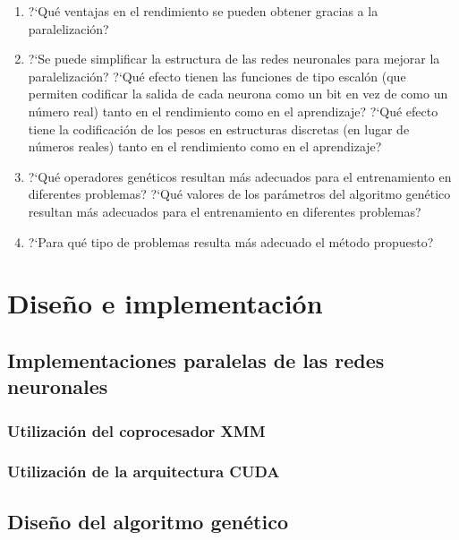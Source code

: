 \documentclass[a4paper,11pt]{article}
\begin{document}
\begin{enumerate}
 
 \item  ?`Qu\'e ventajas en el rendimiento se pueden obtener gracias a la paralelizaci\'on?

 \item  ?`Se puede simplificar la estructura de las redes neuronales para mejorar la paralelizaci\'on? ?`Qu\'e efecto tienen las funciones de tipo escal\'on (que permiten codificar la salida de cada neurona como un bit en vez de como un n\'umero real) tanto en el rendimiento como en el aprendizaje? ?`Qu\'e efecto tiene la codificaci\'on de los pesos en estructuras discretas (en lugar de n\'umeros reales) tanto en el rendimiento como en el aprendizaje?

 \item  ?`Qu\'e operadores gen\'eticos resultan m\'as adecuados para el entrenamiento en diferentes problemas? ?`Qu\'e valores de los par\'ametros del algoritmo gen\'etico resultan m\'as adecuados para el entrenamiento en diferentes problemas?

 \item  ?`Para qu\'e tipo de problemas resulta m\'as adecuado el m\'etodo propuesto? 

\end{enumerate}


\section{Dise\~no e implementaci\'on}\label{diseno}
	\subsection{ Implementaciones paralelas de las redes neuronales}\label{disenoParal}
		\subsubsection{Utilizaci\'on del coprocesador XMM}\label{disenoParalXMM}
		\subsubsection{Utilizaci\'on de la arquitectura CUDA}\label{disenoParalCUDA}
	\subsection{ Dise\~no del algoritmo gen\'etico}\label{disenoGene}
\end{document}
